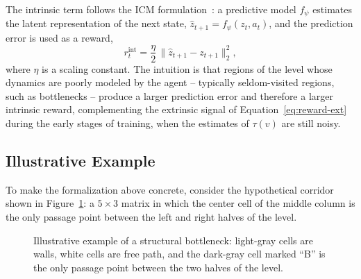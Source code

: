\documentclass[sigconf,nonacm,language=english]{acmart}
\begin{document}
The intrinsic term follows the ICM formulation~\cite{pathak2017curiosity}:
a predictive model $f_\psi$ estimates the latent representation of the next
state, $\hat{z}_{t+1} = f_\psi(z_t, a_t)$, and the prediction error is used
as a reward,
\begin{equation}
  r^{\text{int}}_t = \frac{\eta}{2} \, \lVert \hat{z}_{t+1} - z_{t+1}
    \rVert_2^2,
  \label{eq:reward-int}
\end{equation}
where $\eta$ is a scaling constant. The intuition is that regions of the
level whose dynamics are poorly modeled by the agent -- typically
seldom-visited regions, such as bottlenecks -- produce a larger prediction
error and therefore a larger intrinsic reward, complementing the extrinsic
signal of Equation~\eqref{eq:reward-ext} during the early stages of
training, when the estimates of $\tau(v)$ are still noisy.

\subsection{Illustrative Example}
\label{sec:exemplo}

To make the formalization above concrete, consider the hypothetical
corridor shown in Figure~\ref{fig:exemplo-grid}: a $5 \times 3$ matrix in
which the center cell of the middle column is the only passage point
between the left and right halves of the level.

\begin{figure}
  \centering
  \caption{Illustrative example of a structural bottleneck: light-gray
    cells are walls, white cells are free path, and the dark-gray cell
    marked ``B'' is the only passage point between the two halves of the
    level.}
  \label{fig:exemplo-grid}
\end{figure}
\end{document}
